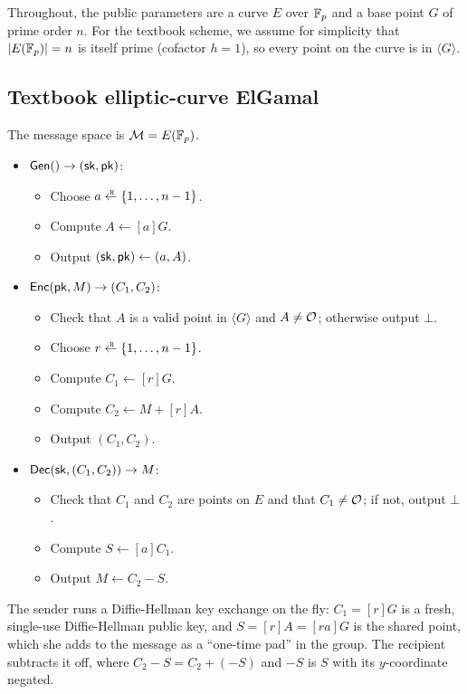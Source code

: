 Throughout, the public parameters are a curve $E$ over $\mathbb{F}_p$ and a base
point $G$ of prime order $n$.
For the textbook scheme, we assume for simplicity that
$|E(\mathbb{F}_p)| = n$ is itself prime (cofactor $h = 1$), so every point on the
curve is in $\langle G \rangle$.

\subsection{Textbook elliptic-curve ElGamal}

\begin{definition}
The message space is $\mathcal{M} = E(\mathbb{F}_p)$.
\begin{itemize}
  \item $\mathsf{Gen}() \to ({\mathsf{sk}}, \mathsf{pk})$:
    \begin{itemize}[noitemsep]
      \item Choose $a \getsr \{1, \dots, n-1\}$.
      \item Compute $A \gets [a]G$.
      \item Output $({\mathsf{sk}}, \mathsf{pk}) \gets (a, A)$.
    \end{itemize}
  \item $\mathsf{Enc}(\mathsf{pk}, M) \to (C_1, C_2)$:
    \begin{itemize}[noitemsep]
      \item Check that $A$ is a valid point in $\langle G\rangle$
            and $A \neq \mathcal{O}$; otherwise output $\bot$.
      \item Choose $r \getsr \{1, \dots, n-1\}$.
      \item Compute $C_1 \gets [r]G$.
      \item Compute $C_2 \gets M + [r]A$.
      \item Output $(C_1, C_2)$.
    \end{itemize}
  \item $\mathsf{Dec}({\mathsf{sk}}, (C_1, C_2)) \to M$:
    \begin{itemize}[noitemsep]
      \item Check that $C_1$ and $C_2$ are points on $E$ and that
            $C_1 \neq \mathcal{O}$; if not, output $\bot$.
      \item Compute $S \gets [a]C_1$.
      \item Output $M \gets C_2 - S$.
    \end{itemize}
\end{itemize}
\end{definition}

The sender runs a Diffie-Hellman key exchange on the fly:
$C_1 = [r]G$ is a fresh, single-use Diffie-Hellman public key, and
$S = [r]A = [ra]G$ is the shared point, which she adds to the message as a
``one-time pad'' in the group. The recipient subtracts it off, where
$C_2 - S = C_2 + (-S)$ and $-S$ is $S$ with its $y$-coordinate negated.

